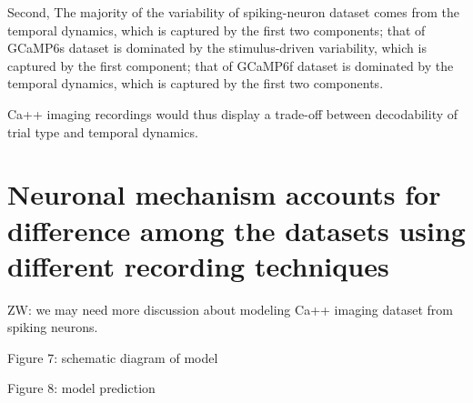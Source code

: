 \documentclass[12pt, oneside]{nature}
\begin{document}
\noindent Second, The majority of the variability of spiking-neuron dataset comes from the
temporal dynamics, which is captured by the first two components; that of
GCaMP6s dataset is dominated by the stimulus-driven variability, which is
captured by the first component; that of GCaMP6f dataset is dominated by 
the temporal dynamics, which is captured by the first two components.

\noindent Ca++ imaging recordings would thus display a
trade-off between decodability of trial type 
and temporal dynamics.

\section*{Neuronal mechanism accounts for difference among the datasets
using different recording techniques}
\noindent ZW: we may need more discussion about modeling Ca++ imaging dataset
from spiking neurons.

\noindent Figure 7: schematic diagram of model

\noindent Figure 8: model prediction


\end{document}
